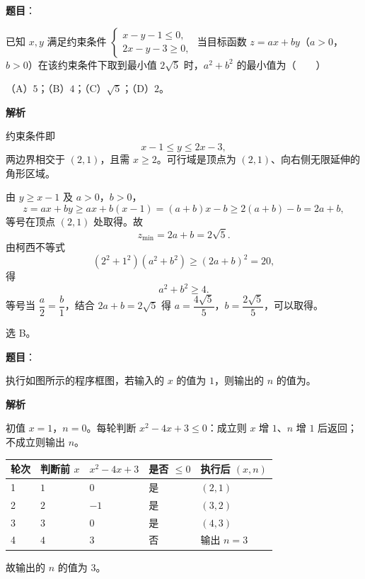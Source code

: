 \begin{answer}

\textbf{题目}：

已知 $x,y$ 满足约束条件 $\begin{cases}x-y-1\leqslant0,\\2x-y-3\geqslant0,\end{cases}$ 当目标函数 $z=ax+by$（$a>0$，$b>0$）在该约束条件下取到最小值 $2\sqrt5$ 时，$a^2+b^2$ 的最小值为\mbox{（　　）}

（A）$5$；（B）$4$；（C）$\sqrt5$；（D）$2$。

\textbf{解析}

约束条件即
\nopagebreak[4]
\[x-1\leqslant y\leqslant2x-3,\]
两边界相交于 $(2,1)$，且需 $x\geqslant2$。可行域是顶点为 $(2,1)$、向右侧无限延伸的角形区域。

由 $y\geqslant x-1$ 及 $a>0$，$b>0$，
\nopagebreak[4]
\[z=ax+by\geqslant ax+b(x-1)=(a+b)x-b\geqslant2(a+b)-b=2a+b,\]
等号在顶点 $(2,1)$ 处取得。故
\nopagebreak[4]
\[z_{\min}=2a+b=2\sqrt5 .\]
由柯西不等式
\nopagebreak[4]
\[(2^2+1^2)(a^2+b^2)\geqslant(2a+b)^2=20,\]
得
\nopagebreak[4]
\[a^2+b^2\geqslant4 .\]
等号当 $\dfrac a2=\dfrac b1$，结合 $2a+b=2\sqrt5$ 得 $a=\dfrac{4\sqrt5}5$，$b=\dfrac{2\sqrt5}5$，可以取得。

选 B。


\end{answer}
\begin{answer}

\textbf{题目}：

执行如图所示的程序框图，若输入的 $x$ 的值为 $1$，则输出的 $n$ 的值为\gkblank{}。
\nopagebreak[4]
\begin{center}\end{center}
\nopagebreak[4]
\textbf{解析}

初值 $x=1$，$n=0$。每轮判断 $x^2-4x+3\leqslant0$：成立则 $x$ 增 $1$、$n$ 增 $1$ 后返回；不成立则输出 $n$。

\begin{center}
\begin{tabular}{lllll}
\toprule
轮次 & 判断前 $x$ & $x^2-4x+3$ & 是否 $\leqslant0$ & 执行后 $(x,n)$ \\
\midrule
1 & $1$ & $0$ & 是 & $(2,1)$ \\
2 & $2$ & $-1$ & 是 & $(3,2)$ \\
3 & $3$ & $0$ & 是 & $(4,3)$ \\
4 & $4$ & $3$ & 否 & 输出 $n=3$ \\
\bottomrule
\end{tabular}
\end{center}

故输出的 $n$ 的值为 $3$。


\end{answer}
